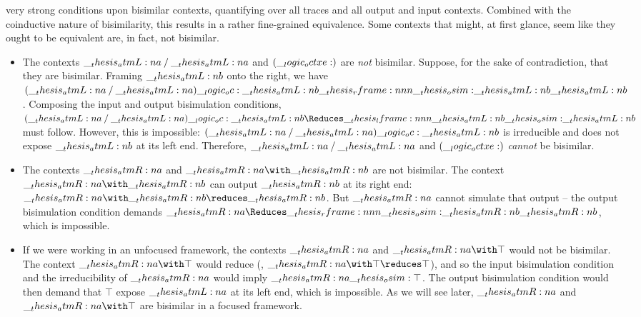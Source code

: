 





 very strong conditions upon bisimilar contexts, quantifying over all traces %
and
all output and input contexts.
Combined with the coinductive nature of bisimilarity, this results in a rather fine-grained equivalence.
Some contexts that might, at first glance, seem like they ought to be equivalent are, in fact, not bisimilar.
\begin{itemize}
\item The contexts $\__thesis_atmL:n {a} \mathbin { / } \__thesis_atmL:n {a}$ and $(\__logic_octxe:)$ are \emph{not} bisimilar.
  Suppose, for the sake of contradiction, that they are bisimilar.
  Framing $\__thesis_atmL:n {b}$ onto the right, we have $(\atmL{a} \pmir \atmL{a}) \oc \atmL{b} \rframe{\osim}{\atmL{b}} \atmL{b}$.
  Composing the input and output bisimulation conditions, $(\atmL{a} \pmir \atmL{a}) \oc \atmL{b} \Reduces\lframe{\atmL{b}}{\osim} \atmL{b}$ must follow.
  However, this is impossible: $(\__thesis_atmL:n {a} \mathbin { / } \__thesis_atmL:n {a}) \__logic_oc: \__thesis_atmL:n {b}$ is irreducible and does not expose $\__thesis_atmL:n {b}$ at its left end.
  Therefore, $\__thesis_atmL:n {a} \mathbin { / } \__thesis_atmL:n {a}$ and $(\__logic_octxe:)$ \emph{cannot} be bisimilar.

\item The contexts $\__thesis_atmR:n {a}$ and $\atmR{a} \with \atmR{b}$ are not bisimilar.
  The context $\atmR{a} \with \atmR{b}$ can output $\__thesis_atmR:n {b}$ at its right end: $\atmR{a} \with \atmR{b} \reduces \atmR{b}$.
  But $\__thesis_atmR:n {a}$ cannot simulate that output -- the output bisimulation condition demands $\atmR{a} \Reduces\rframe{\osim}{\atmR{b}} \atmR{b}$, which is impossible.

\item If we were working in an unfocused framework, the contexts $\__thesis_atmR:n {a}$ and $\atmR{a} \with \top$ would not be bisimilar.
  The context $\atmR{a} \with \top$ would reduce (\ie, $\atmR{a} \with \top \reduces \top$), and so the input bisimulation condition and the irreducibility of $\__thesis_atmR:n {a}$ would imply $\__thesis_atmR:n {a} \__thesis_osim: \top$.
  The output bisimulation condition would then demand that $\top$ expose $\__thesis_atmL:n {a}$ at its left end, which is impossible.
  As we will see later, $\__thesis_atmR:n {a}$ and $\atmR{a} \with \top$ are bisimilar in a focused framework.
\end{itemize}

